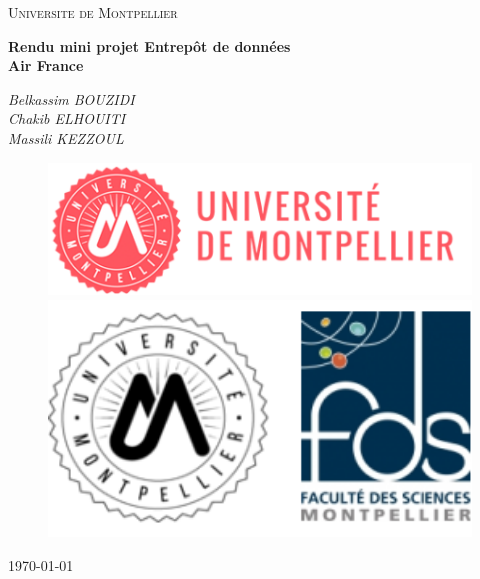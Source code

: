 \documentclass[oneside,13pt,a4paper]{article}
\title{}
\author{
    Belkassim BOUZIDI \and
    Chakib ELHOUITI \and
    Massili KEZZOUL \and
   
}
\date{\today}
\begin{document}
\begin{titlepage}
  \centering
  {\scshape\LARGE Universite de Montpellier\par}
  {\scshape\Large\par}
  \vspace{1.5cm}
  {\huge\bfseries Rendu mini projet Entrepôt de données\\Air France\par}
  \vspace{2cm}
  {\Large\itshape
    Belkassim BOUZIDI \\
    Chakib ELHOUITI \\
    Massili KEZZOUL \\

    \par}





  \vspace{2cm}

  \begin{figure}[h]
    \begin{minipage}[c]{.46\linewidth}
      \centering
      \includegraphics[width=1\textwidth]{img/univ-montpellier.png}
    \end{minipage}
    \hfill%
    \begin{minipage}[c]{.46\linewidth}
      \centering
      \includegraphics[width=1\textwidth]{img/fds.png}
    \end{minipage}
  \end{figure}

  \par\vspace{1cm}

  \vfill

  {\large \today\par}
\end{titlepage}
\end{document}
